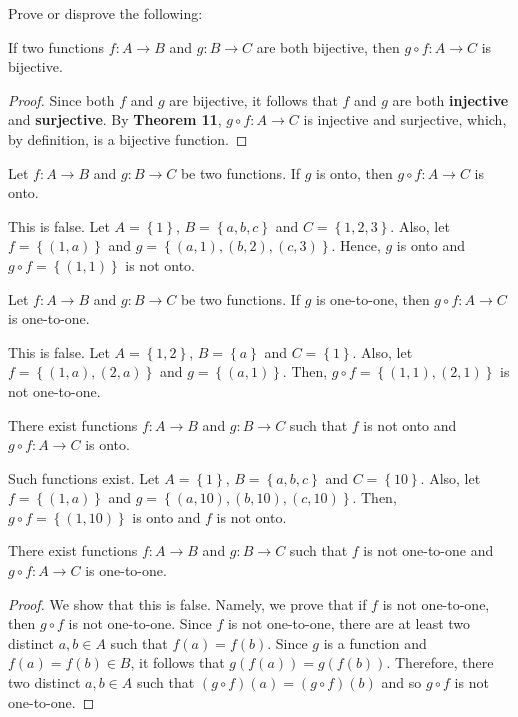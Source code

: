 \documentclass[12pt]{article}
\newenvironment{problem}[2][Problem]{\begin{trivlist} \item[\hskip \labelsep {\bfseries #1}\hskip \labelsep {\bfseries #2.}]}{\end{trivlist}}
\newenvironment{solution}[1][Solution]{\begin{trivlist} \item[\hskip \labelsep {\bfseries #1}]}{\end{trivlist}}
\begin{document}
    \begin{problem}{42}
      Prove or disprove the following:
    \begin{enumerate}
      \item If two functions $f:A\to B$ and $g:B\to C$ are both bijective, then $g\circ f:A\to C$ is bijective.
    \begin{proof}
      Since both $f$ and $g$ are bijective, it follows that $f$ and $g$ are both \textbf{injective} and \textbf{surjective}. By \textbf{Theorem 11}, $g\circ f: A\to C$ is injective and surjective, which, by definition, is a bijective function. 
    \end{proof}
      \item Let $f:A\to B$ and $g:B\to C$ be two functions. If $g$ is onto, then $g\circ f: A\to C$ is onto.
    \begin{solution}
      This is false. Let $A=\left\{ 1\right\}$, $B=\left\{ a,b,c \right\}$ and $C=\left\{ 1,2,3 \right\}$. Also, let $f=\left\{ (1,a) \right\}$ and $g=\left\{ (a,1),(b,2),(c,3) \right\}$. Hence, $g$ is onto and $g\circ f= \left\{ (1,1) \right\}$ is not onto. 
    \end{solution}
      \item Let $f:A\to B$ and $g:B\to C$ be two functions. If $g$ is one-to-one, then $g\circ f: A\to C$ is one-to-one.
    \begin{solution}
      This is false. Let $A=\left\{ 1,2 \right\}$, $B=\left\{ a \right\}$ and $C=\left\{ 1 \right\}$. Also, let $f=\left\{ (1,a), (2,a)\right\}$ and $g=\left\{ (a,1) \right\}$. Then, $g\circ f=\left\{ (1,1),(2,1) \right\}$ is not one-to-one.
    \end{solution}
      \item There exist functions $f:A\to B$ and $g:B\to C$ such that $f$ is not onto and $g\circ f: A\to C$ is onto.
    \begin{solution}
      Such functions exist. Let $A=\left\{1\right\}$, $B=\left\{a,b,c\right\}$ and $C=\left\{10 \right\}$. Also, let $f=\left\{ (1,a) \right\}$ and $g=\left\{ (a,10),(b,10),(c,10) \right\}$. Then, $g\circ f = \left\{ (1,10) \right\}$ is onto and $f$ is not onto.
    \end{solution}
      \item There exist functions $f:A\to B$ and $g:B\to C$ such that $f$ is not one-to-one and $g\circ f: A\to C$ is one-to-one.
    \begin{proof}
      We show that this is false. Namely, we prove that if $f$ is not one-to-one, then $g\circ f$ is not one-to-one. Since $f$ is not one-to-one, there are at least two distinct $a,b\in A$ such that $f(a)=f(b)$. Since $g$ is a function and $f(a)=f(b)\in B$, it follows that  $g(f(a)) = g(f(b))$. Therefore, there two distinct $a,b\in A$ such that $(g\circ f)(a) = (g\circ f)(b)$ and so $g\circ f$ is not one-to-one.
    \end{proof}
    \end{enumerate}
    \end{problem}
\end{document}
